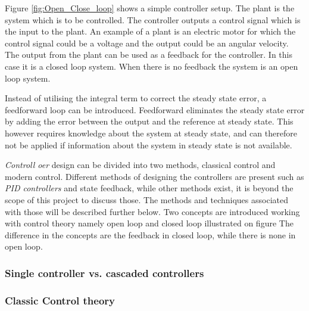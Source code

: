 \documentclass[../../main.tex]{subfiles}
\begin{document}
Figure \ref{fig:Open_Close_loop} shows a simple controller setup. The plant is the system which is to be controlled. The controller outputs a control signal which is the input to the plant. An example of a plant is an electric motor for which the control signal could be a voltage and the output could be an angular velocity. The output from the plant can be used as a feedback for the controller. In this case it is a closed loop system. When there is no feedback the system is an open loop system. 



Instead of utilising the integral term to correct the steady state error, a feedforward loop can be introduced. Feedforward eliminates the steady state error by adding the error between the output and the reference at steady state. This however requires knowledge about the system at steady state, and can therefore not be applied if information about the system in steady state is not available. 


\textit{Controll oer} design can be divided into two methods, classical control and modern control. Different methods of designing the controllers are present such as \textit{PID controllers} and state feedback, while other methods exist, it is beyond the scope of this project to discuss those. The methods and techniques associated with those will be described further below. Two concepts are introduced working with control theory namely open loop and closed loop illustrated on figure  The difference in the concepts are the feedback in closed loop, while there is none in open loop.


\subsubsection*{Single controller vs. cascaded controllers}

\subsubsection*{Classic Control theory}
\end{document}
